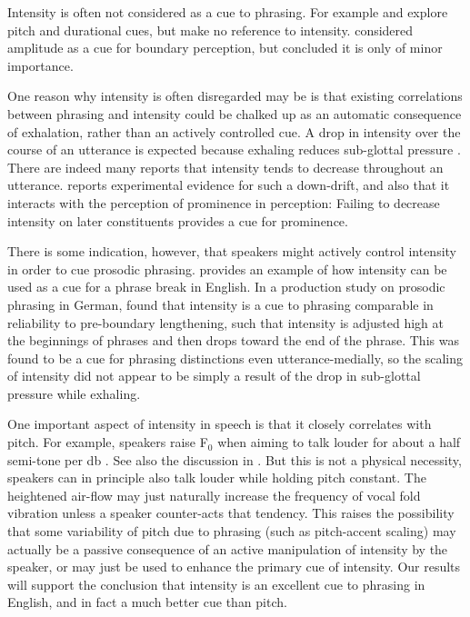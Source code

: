 \documentclass[preprint,review,12pt,authoryear,times]{elsarticle}
\begin{document}
Intensity is often not considered as a cue to phrasing. For example  \citet{price91} and \citet{wight92} explore pitch and durational cues, but make no reference to intensity. \citet{stree78} considered amplitude as a cue for boundary perception, but concluded it is only of minor importance. 

One reason why intensity is often disregarded may be is that existing correlations between phrasing and intensity could be chalked up as an automatic consequence of exhalation, rather than an actively controlled cue. A drop in intensity over the course of an utterance is expected because exhaling reduces sub-glottal pressure \citep{bjork16}. There are indeed many reports that intensity tends to decrease throughout an utterance. \citet{pierr79} reports experimental evidence for such a down-drift, and also that it interacts with the perception of prominence in perception: Failing to decrease intensity on later constituents provides a cue for prominence.  

There is some indication, however, that speakers might actively control intensity in order to cue prosodic phrasing. \citet{trouv98} provides an example of how intensity can be used as a cue for a phrase break in English. In a production study on prosodic phrasing in German, \citet{poschmannwagner16} found that intensity is a cue to phrasing comparable in reliability to pre-boundary lengthening, such that intensity is adjusted high at the beginnings of phrases and then drops toward the end of the phrase. This was found to be a cue for phrasing distinctions even utterance-medially, so the scaling of intensity did not appear to be simply a result of the drop in sub-glottal pressure while exhaling.  

One important aspect of intensity in speech is that it closely correlates with pitch. For example, speakers raise F$_0$ when aiming to talk louder for about a half semi-tone per db \citep{gramm88}. See also the discussion in \citet{vaiss83}. But this is not a physical necessity, speakers can in principle also talk louder while holding pitch constant. The heightened air-flow may just naturally increase the frequency of vocal fold vibration unless a speaker counter-acts that tendency. This raises the possibility that some variability of pitch due to phrasing (such as pitch-accent scaling) may actually be a passive consequence of an active manipulation of intensity by the speaker, or may just be used to enhance the primary cue of intensity. Our results will support the conclusion that intensity is an excellent cue to phrasing in English, and in fact a much better cue than pitch.
\end{document}
